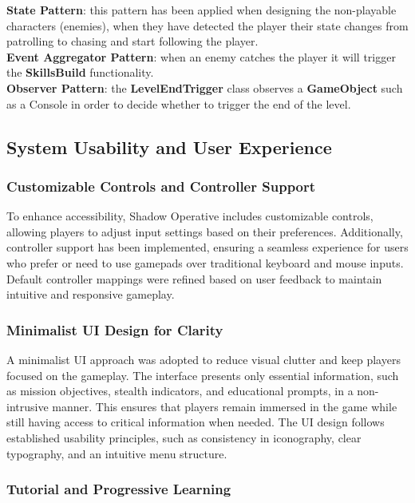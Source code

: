 \documentclass[11pt, a4paper]{article}
\begin{document}
\noindent \textbf{State Pattern}: this pattern has been applied when designing the non-playable characters (enemies), when they have detected the player their state changes from patrolling to chasing and start following the player. \\

\noindent \textbf{Event Aggregator Pattern}: when an enemy catches the player it will trigger the \textbf{SkillsBuild} functionality. \\

\noindent \textbf{Observer Pattern}: the \textbf{LevelEndTrigger} class observes a \textbf{GameObject} such as a Console in order to decide whether to trigger the end of the level.

\subsection{System Usability and User Experience}

\subsubsection{Customizable Controls and Controller Support}

\noindent To enhance accessibility, Shadow Operative includes customizable controls, allowing players to adjust input settings based on their preferences. Additionally, controller support has been implemented, ensuring a seamless experience for users who prefer or need to use gamepads over traditional keyboard and mouse inputs. Default controller mappings were refined based on user feedback to maintain intuitive and responsive gameplay.

\subsubsection{Minimalist UI Design for Clarity}

\noindent A minimalist UI approach was adopted to reduce visual clutter and keep players focused on the gameplay. The interface presents only essential information, such as mission objectives, stealth indicators, and educational prompts, in a non-intrusive manner. This ensures that players remain immersed in the game while still having access to critical information when needed. The UI design follows established usability principles, such as consistency in iconography, clear typography, and an intuitive menu structure.

\subsubsection{Tutorial and Progressive Learning}
\end{document}
